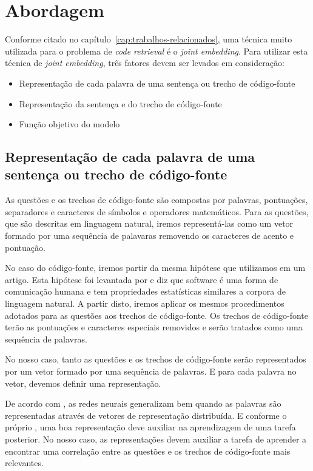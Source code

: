 \chapter{Abordagem}
\label{cap:abordagem}


Conforme citado no capítulo~\ref{cap:trabalhos-relacionados}, uma técnica muito utilizada para o problema de \textit{code retrieval} é o \textit{joint embedding}. Para utilizar esta técnica de \textit{joint embedding}, três fatores devem ser levados em consideração:

\begin{itemize}
    \item Representação de cada palavra de uma sentença ou trecho de código-fonte
    \item Representação da sentença e do trecho de código-fonte
    \item Função objetivo do modelo
\end{itemize}

\section{Representação de cada palavra de uma sentença ou trecho de código-fonte}
\label{sec:abordagem-representacao-token}

As questões e os trechos de código-fonte são compostas por palavras, pontuações, separadores e caracteres de símbolos e operadores matemáticos. Para as questões, que são descritas em linguagem natural, iremos representá-las como um vetor formado por uma sequência de palavaras removendo os caracteres de acento e pontuação.

No caso do código-fonte, iremos partir da  mesma hipótese que utilizamos em um artigo. Esta hipótese foi levantada por \cite{Allamanis:2018:SML} e diz que software é uma forma de comunicação humana e tem propriedades estatísticas similares a corpora de linguagem natural. A partir disto, iremos aplicar os mesmos procedimentos adotados para as questões aos trechos de código-fonte. Os trechos de código-fonte terão as pontuações e caracteres especiais removidos e serão tratados como uma sequência de palavras.

No nosso caso, tanto as questões e os trechos de código-fonte serão representados por um vetor formado por uma sequência de palavras. E para cada palavra no vetor, devemos definir uma representação.

De acordo com \cite{Goodfellow-et-al-2016:representation-learning}, as redes neurais generalizam bem quando as palavras são representadas através de vetores de representação distribuída. E conforme o próprio \cite{Goodfellow-et-al-2016:representation-learning}, uma boa representação deve auxiliar na aprendizagem de uma tarefa posterior. No nosso caso, as representações devem auxiliar a tarefa de aprender a encontrar uma correlação entre as questões e os trechos de código-fonte mais relevantes.

